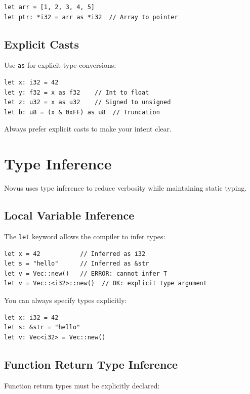 \begin{lstlisting}
let arr = [1, 2, 3, 4, 5]
let ptr: *i32 = arr as *i32  // Array to pointer
\end{lstlisting}

\subsection{Explicit Casts}

Use \texttt{as} for explicit type conversions:

\begin{lstlisting}
let x: i32 = 42
let y: f32 = x as f32    // Int to float
let z: u32 = x as u32    // Signed to unsigned
let b: u8 = (x & 0xFF) as u8  // Truncation
\end{lstlisting}

Always prefer explicit casts to make your intent clear.

\section{Type Inference}

Novus uses type inference to reduce verbosity while maintaining static typing.

\subsection{Local Variable Inference}

The \texttt{let} keyword allows the compiler to infer types:

\begin{lstlisting}
let x = 42           // Inferred as i32
let s = "hello"      // Inferred as &str
let v = Vec::new()   // ERROR: cannot infer T
let v = Vec::<i32>::new()  // OK: explicit type argument
\end{lstlisting}

You can always specify types explicitly:

\begin{lstlisting}
let x: i32 = 42
let s: &str = "hello"
let v: Vec<i32> = Vec::new()
\end{lstlisting}

\subsection{Function Return Type Inference}

Function return types must be explicitly declared:

